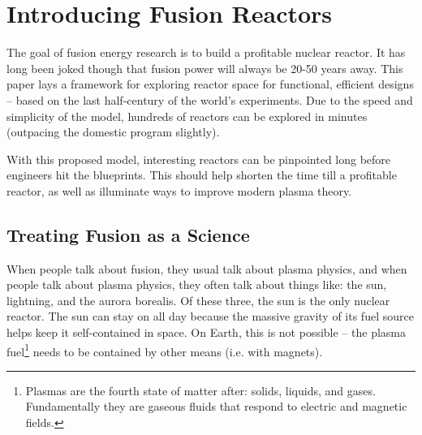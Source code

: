 %
%
%
%
%
%
%
%

\chapter{Introducing Fusion Reactors}

The goal of fusion energy research is to build a profitable nuclear reactor. It has long been joked though that fusion power will always be 20-50 years away. This paper lays a framework for exploring reactor space for functional, efficient designs -- based on the last half-century of the world's experiments. Due to the speed and simplicity of the model, hundreds of reactors can be explored in minutes (outpacing the domestic program slightly).

With this proposed model, interesting reactors can be pinpointed long before engineers hit the blueprints. This should help shorten the time till a profitable reactor, as well as illuminate ways to improve modern plasma theory.

\section{Treating Fusion  as a Science}

When people talk about fusion, they usual talk about plasma physics, and when people talk about plasma physics, they often talk about things like: the sun, lightning, and the aurora borealis. Of these three, the sun is the only nuclear reactor. The sun can stay on all day because the massive gravity of its fuel source helps keep it self-contained in space. On Earth, this is not possible -- the plasma fuel\footnote{Plasmas are the fourth state of matter after: solids, liquids, and gases. Fundamentally they are gaseous fluids that respond to electric and magnetic fields.} needs to be contained by other means (i.e. with magnets).

